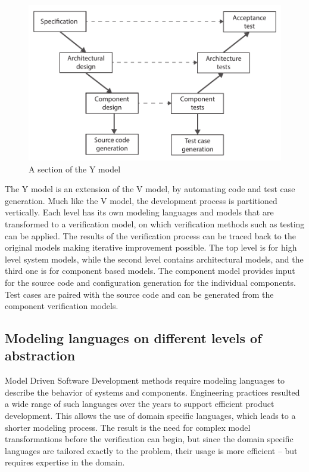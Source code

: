 \begin{figure}[h]
	\centering
	\includegraphics[width=0.8\linewidth]{figures/chapter_2/YModel}
	\caption{A section of the Y model \redraw }
	\label{fig:intro:ymodel}
\end{figure}

The Y model\citep{ymodel} is an extension of the V model\citep{randomwikipedialink3}, by automating code and test case generation. Much like the V model, the development process is partitioned vertically. Each level has its own modeling languages and models that are transformed to a verification model, on which verification methods such as testing can be applied. The results of the verification process can be traced back to the original models making iterative improvement possible. The top level is for high level system models, while the second level contains architectural models, and the third one is for component based models. The component model provides input for the source code and configuration generation for the individual components. Test cases are paired with the source code and can be generated from the component verification models.


\subsection{Modeling languages on different levels of abstraction}

Model Driven Software Development methods require modeling languages to describe the behavior of systems and components. Engineering practices resulted a wide range of such languages over the years to support efficient product development. This allows the use of domain specific languages, which leads to a shorter modeling process. The result is the need for complex model transformations before the verification can begin,
but since the domain specific languages are tailored exactly to the problem, their usage is more efficient -- but requires expertise in the domain.  

